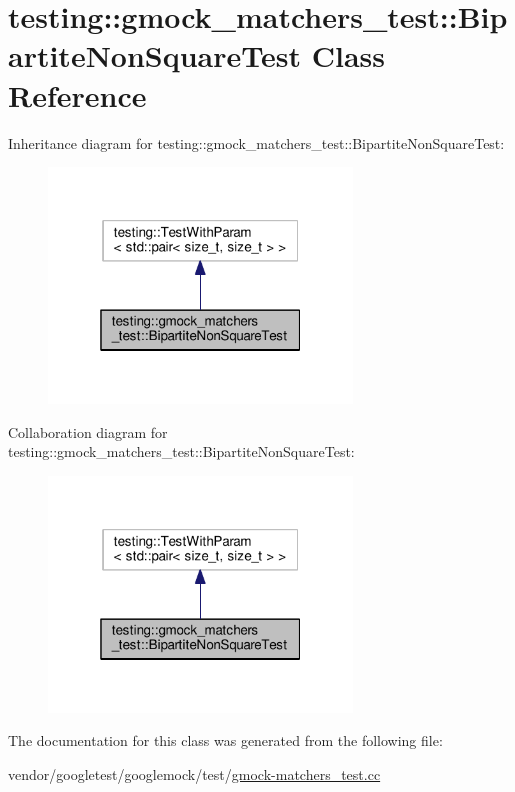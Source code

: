 \hypertarget{classtesting_1_1gmock__matchers__test_1_1BipartiteNonSquareTest}{}\section{testing\+:\+:gmock\+\_\+matchers\+\_\+test\+:\+:Bipartite\+Non\+Square\+Test Class Reference}
\label{classtesting_1_1gmock__matchers__test_1_1BipartiteNonSquareTest}


Inheritance diagram for testing\+:\+:gmock\+\_\+matchers\+\_\+test\+:\+:Bipartite\+Non\+Square\+Test\+:
\nopagebreak
\begin{figure}[H]
\begin{center}
\leavevmode
\includegraphics[width=229pt]{classtesting_1_1gmock__matchers__test_1_1BipartiteNonSquareTest__inherit__graph}
\end{center}
\end{figure}


Collaboration diagram for testing\+:\+:gmock\+\_\+matchers\+\_\+test\+:\+:Bipartite\+Non\+Square\+Test\+:
\nopagebreak
\begin{figure}[H]
\begin{center}
\leavevmode
\includegraphics[width=229pt]{classtesting_1_1gmock__matchers__test_1_1BipartiteNonSquareTest__coll__graph}
\end{center}
\end{figure}


The documentation for this class was generated from the following file\+:\begin{DoxyCompactItemize}
\item 
vendor/googletest/googlemock/test/\hyperlink{gmock-matchers__test_8cc}{gmock-\/matchers\+\_\+test.\+cc}\end{DoxyCompactItemize}
